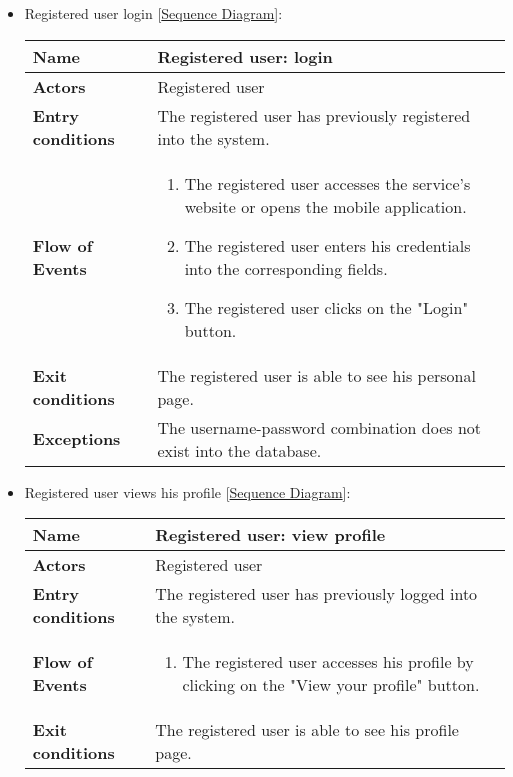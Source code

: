 \begin{itemize}
		\item Registered user login [\hyperlink{Login}{Sequence Diagram}]:
	\begin{table}[H]
		\centering
		\begin{tabular}{| m{3.5cm} | m{9.5cm} |}
			\hline
			\textbf{Name} & Registered user: login\\
			\hline
			\textbf{Actors} & Registered user\\
			\hline
			\textbf{Entry conditions} & The registered user has previously registered into the system.\\
			\hline
			\textbf{Flow of Events} & 
			\begin{enumerate}
				\item The registered user accesses the service's website or opens the mobile application.
				\item The registered user enters his credentials into the corresponding fields.
				\item The registered user clicks on the "Login" button.
			\end{enumerate} \\
			\hline
			\textbf{Exit conditions} & The registered user is able to see his personal page.\\
			\hline
			\textbf{Exceptions} & The username-password combination does not exist into the database. \\
			\hline
		\end{tabular}
	\end{table}
\newpage
	\item Registered user views his profile [\hyperlink{ViewProfile}{Sequence Diagram}]:
	\begin{table}[H]
		\centering
		\begin{tabular}{| m{3.5cm} | m{9.5cm} |}
			\hline
			\textbf{Name} & Registered user: view profile\\
			\hline
			\textbf{Actors} & Registered user\\
			\hline
			\textbf{Entry conditions} & The registered user has previously logged into the system.\\
			\hline
			\textbf{Flow of Events} & 
			\begin{enumerate}
				\item The registered user accesses his profile by clicking on the "View your profile" button.
			\end{enumerate} \\
			\hline
			\textbf{Exit conditions} & The registered user is able to see his profile page.\\

\end{tabular}
\end{table}
\end{itemize}
